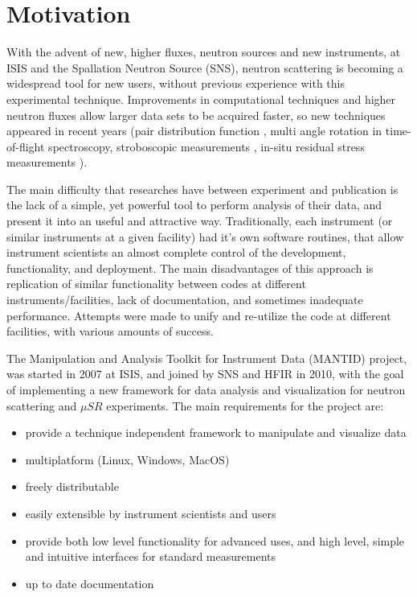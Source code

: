 \documentclass{elsarticle}
\begin{document}
\section{Motivation}
\label{motivation}
With the advent of new, higher fluxes, neutron sources and new instruments, at ISIS and the Spallation Neutron Source (SNS), 
neutron scattering is becoming a widespread tool for new users, without previous experience with this experimental technique. Improvements in computational techniques and higher neutron fluxes allow larger data sets to be acquired faster, so new techniques appeared in recent years (pair distribution function \cite{Egami}, multi angle rotation in time-of-flight spectroscopy, stroboscopic measurements \cite{Nojiri}, in-situ residual stress measurements \cite{Wang}). 

The main difficulty that researches have between experiment and publication
is the lack of a simple, yet powerful tool to perform analysis of their data,
and present it into an useful and attractive way.
Traditionally, each instrument (or similar instruments at a given facility) had it's own software routines, that allow instrument scientists an almost complete control of the development, functionality, and deployment. 
The main disadvantages of this approach is replication of similar functionality between codes at different instruments/facilities, lack of documentation, and sometimes inadequate performance. Attempts were made to unify and re-utilize the code at different facilities, \cite{DAVE, OpenGenie, LAMP} with various amounts of success. 


The Manipulation and Analysis Toolkit for Instrument Data (MANTID) project, was started in 2007 at ISIS, and joined by SNS and HFIR in 2010, with the goal of implementing a new framework for data analysis and visualization for neutron scattering and $\mu SR$ experiments. The main requirements for the project are:
\begin{itemize}
\item provide a technique independent framework to manipulate and visualize data 
\item multiplatform (Linux, Windows, MacOS)
\item freely distributable
\item easily extensible by instrument scientists and users
\item provide both low level functionality for advanced uses, and high level, simple and intuitive interfaces for standard measurements 
\item up to date documentation
\end{itemize}
 
\end{document}
